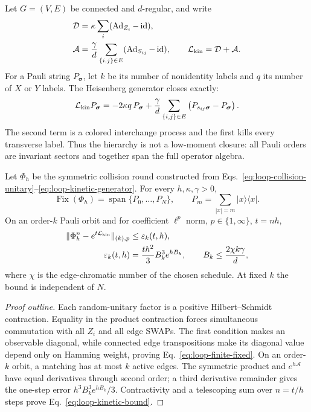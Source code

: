 Let \(G=(V,E)\) be connected and \(d\)-regular, and write
\begin{align}
 \mathcal D&=\kappa\sum_i(\operatorname{Ad}_{Z_i}-\operatorname{id}),
 \nonumber\\
 \mathcal A&=\frac{\gamma}{d}\sum_{\{i,j\}\in E}
   (\operatorname{Ad}_{S_{ij}}-\operatorname{id}),
 \qquad
 \mathcal L_{\rm kin}=\mathcal D+\mathcal A .
 \label{eq:loop-kinetic-generator}
\end{align}
For a Pauli string \(P_{\boldsymbol\sigma}\), let \(k\) be its number of
nonidentity labels and \(q\) its number of \(X\) or \(Y\) labels.  The
Heisenberg generator closes exactly:
\begin{equation}
 \mathcal L_{\rm kin}P_{\boldsymbol\sigma}
 =-2\kappa q\,P_{\boldsymbol\sigma}
 +\frac{\gamma}{d}\sum_{\{i,j\}\in E}
  \left(P_{s_{ij}\boldsymbol\sigma}-P_{\boldsymbol\sigma}\right).
 \label{eq:loop-pauli-hierarchy}
\end{equation}
The second term is a colored interchange process and the first kills every
transverse label.  Thus the hierarchy is not a low-moment closure: all Pauli
orders are invariant sectors and together span the full operator algebra.

\begin{theorem}
\label{thm:loop-unitary-kinetics}
Let \(\Phi_h\) be the symmetric collision round constructed from
Eqs.~\eqref{eq:loop-collision-unitary}--\eqref{eq:loop-kinetic-generator}.
For every \(h,\kappa,\gamma>0\),
\begin{equation}
 \operatorname{Fix}(\Phi_h)
 =\operatorname{span}\{P_0,\ldots,P_N\},
 \qquad
 P_m=\sum_{|x|=m}|x\rangle\langle x|.
 \label{eq:loop-finite-fixed}
\end{equation}
On an order-\(k\) Pauli orbit and for coefficient
\(\ell^p\) norm, \(p\in\{1,\infty\}\), \(t=nh\),
\begin{align}
 \|\Phi_h^n-e^{t\mathcal L_{\rm kin}}\|_{(k),p}
 &\le \varepsilon_k(t,h),\nonumber\\
 \varepsilon_k(t,h)
 &=\frac{t h^2}{3}B_k^3e^{hB_k},
 \qquad
 B_k\le\frac{2\chi k\gamma}{d},
 \label{eq:loop-kinetic-bound}
\end{align}
where \(\chi\) is the edge-chromatic number of the chosen schedule.  At
fixed \(k\) the bound is independent of \(N\).
\end{theorem}

\begin{proof}[Proof outline]
Each random-unitary factor is a positive Hilbert--Schmidt contraction.
Equality in the product contraction forces simultaneous commutation with
all \(Z_i\) and all edge SWAPs.  The first condition makes an observable
diagonal, while connected edge transpositions make its diagonal value
depend only on Hamming weight, proving
Eq.~\eqref{eq:loop-finite-fixed}.  On an order-\(k\) orbit, a matching has at
most \(k\) active edges.  The symmetric product and
\(e^{h\mathcal A}\) have equal derivatives through second order; a third
derivative remainder gives the one-step error
\(h^3B_k^3e^{hB_k}/3\).  Contractivity and a telescoping sum over \(n=t/h\)
steps prove Eq.~\eqref{eq:loop-kinetic-bound}.
\end{proof}

